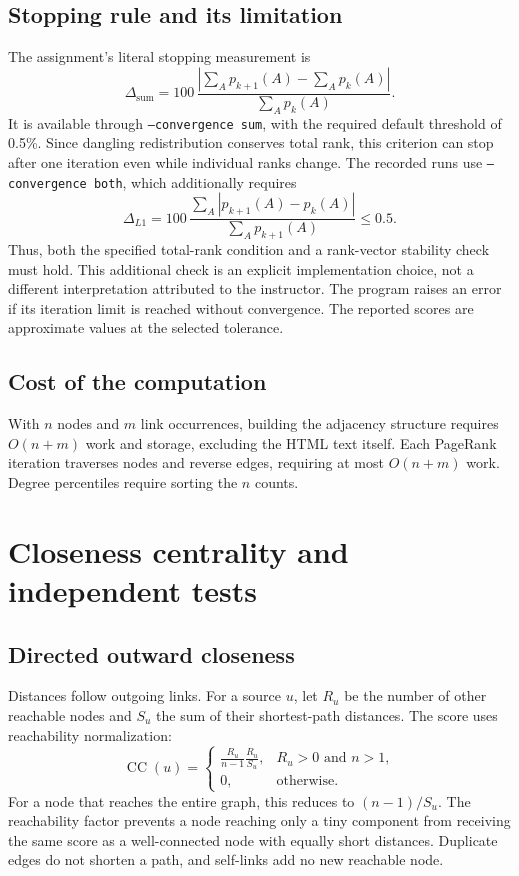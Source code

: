 \documentclass[10pt,letterpaper]{article}
\begin{document}
\subsection{Stopping rule and its limitation}
The assignment's literal stopping measurement is
\[
\Delta_{\mathrm{sum}}=100\,
\frac{|\sum_A p_{k+1}(A)-\sum_A p_k(A)|}{\sum_A p_k(A)}.
\]
It is available through \texttt{--convergence sum}, with the required default
threshold of 0.5\%. Since dangling redistribution conserves total rank, this
criterion can stop after one iteration even while individual ranks change.
The recorded runs use \texttt{--convergence both}, which additionally requires
\[
\Delta_{L1}=100\,
\frac{\sum_A|p_{k+1}(A)-p_k(A)|}{\sum_A p_{k+1}(A)}\leq0.5.
\]
Thus, both the specified total-rank condition and a rank-vector stability check
must hold. This additional check is an explicit implementation choice, not a
different interpretation attributed to the instructor. The program raises an
error if its iteration limit is reached without convergence. The reported
scores are approximate values at the selected tolerance.

\subsection{Cost of the computation}
With \(n\) nodes and \(m\) link occurrences, building the adjacency structure
requires \(O(n+m)\) work and storage, excluding the HTML text itself. Each
PageRank iteration traverses nodes and reverse edges, requiring at most
\(O(n+m)\) work. Degree percentiles require sorting the \(n\) counts.

\clearpage
\section{Closeness centrality and independent tests}
\subsection{Directed outward closeness}
Distances follow outgoing links. For a source \(u\), let \(R_u\) be the number
of other reachable nodes and \(S_u\) the sum of their shortest-path distances.
The score uses reachability normalization:
\[
\operatorname{CC}(u)=
\begin{cases}
\displaystyle\frac{R_u}{n-1}\frac{R_u}{S_u},&R_u>0\text{ and }n>1,\\[5pt]
0,&\text{otherwise}.
\end{cases}
\]
For a node that reaches the entire graph, this reduces to \((n-1)/S_u\).
The reachability factor prevents a node reaching only a tiny component from
receiving the same score as a well-connected node with equally short distances.
Duplicate edges do not shorten a path, and self-links add no new reachable node.
\end{document}
